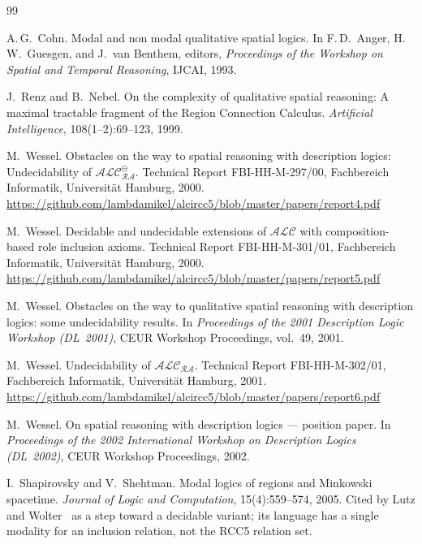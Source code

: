 \documentclass[11pt]{article}
\newcommand{\ALC}{\ensuremath{\mathcal{ALC}}}
\theoremstyle{plain}
\theoremstyle{definition}
\begin{document}
\newpage
\begin{thebibliography}{99}


A.\,G.\ Cohn.
\newblock Modal and non modal qualitative spatial logics.
\newblock In F.\,D.\ Anger, H.\,W.\ Guesgen, and J.\ van Benthem, editors,
  \emph{Proceedings of the Workshop on Spatial and Temporal Reasoning},
  IJCAI, 1993.

J.\ Renz and B.\ Nebel.
\newblock On the complexity of qualitative spatial reasoning:
  A maximal tractable fragment of the Region Connection Calculus.
\newblock \emph{Artificial Intelligence}, 108(1--2):69--123, 1999.

M.\ Wessel.
\newblock Obstacles on the way to spatial reasoning with description
  logics: Undecidability of $\ALC_{\mathcal{RA}}^\ominus$.
\newblock Technical Report FBI-HH-M-297/00, Fachbereich Informatik,
  Universit\"at Hamburg, 2000.
\newblock \url{https://github.com/lambdamikel/alcircc5/blob/master/papers/report4.pdf}

M.\ Wessel.
\newblock Decidable and undecidable extensions of $\ALC$ with
  composition-based role inclusion axioms.
\newblock Technical Report FBI-HH-M-301/01, Fachbereich Informatik,
  Universit\"at Hamburg, 2000.
\newblock \url{https://github.com/lambdamikel/alcircc5/blob/master/papers/report5.pdf}

M.\ Wessel.
\newblock Obstacles on the way to qualitative spatial reasoning with
  description logics: some undecidability results.
\newblock In \emph{Proceedings of the 2001 Description Logic Workshop
  (DL~2001)}, CEUR Workshop Proceedings, vol.~49, 2001.

M.\ Wessel.
\newblock Undecidability of $\ALC_{\mathcal{RA}}$.
\newblock Technical Report FBI-HH-M-302/01, Fachbereich Informatik,
  Universit\"at Hamburg, 2001.
\newblock \url{https://github.com/lambdamikel/alcircc5/blob/master/papers/report6.pdf}

M.\ Wessel.
\newblock On spatial reasoning with description logics --- position paper.
\newblock In \emph{Proceedings of the 2002 International Workshop on
  Description Logics (DL~2002)}, CEUR Workshop Proceedings, 2002.

I.\ Shapirovsky and V.\ Shehtman.
\newblock Modal logics of regions and Minkowski spacetime.
\newblock \emph{Journal of Logic and Computation}, 15(4):559--574, 2005.
\newblock Cited by Lutz and Wolter~\cite{LutzWolter2006} as a step toward a
  decidable variant; its language has a single modality for an inclusion
  relation, not the RCC5 relation set.


\end{thebibliography}
\end{document}

